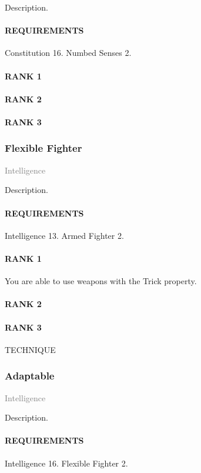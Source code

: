 \normalsize
Description.
\paragraph{REQUIREMENTS} Constitution 16. Numbed Senses 2.
\paragraph{RANK 1}
\paragraph{RANK 2}
\paragraph{RANK 3}

\subsubsection{Flexible Fighter} \label{feat::flexiblefighter} %
\small{\textcolor{gray}{Intelligence}}

\normalsize
Description.
\paragraph{REQUIREMENTS} Intelligence 13. Armed Fighter 2.
\paragraph{RANK 1} You are able to use weapons with the Trick property.
\paragraph{RANK 2}
\paragraph{RANK 3} TECHNIQUE

\subsubsection{Adaptable} \label{feat::adaptable} %
\small{\textcolor{gray}{Intelligence}}

\normalsize
Description.
\paragraph{REQUIREMENTS} Intelligence 16. Flexible Fighter 2.
